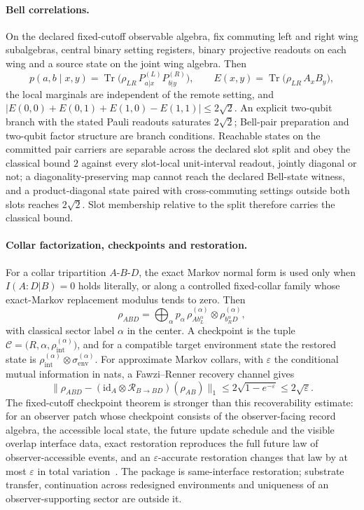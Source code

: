 \documentclass[11pt]{article}
\begin{document}
\paragraph{Bell correlations.}
On the declared fixed-cutoff observable algebra, fix commuting left and right
wing subalgebras, central binary setting registers, binary projective readouts
on each wing and a source state on the joint wing algebra. Then
\[
p(a,b\mid x,y)
=\operatorname{Tr}\!\bigl(\rho_{LR}\,P_{a|x}^{(L)}P_{b|y}^{(R)}\bigr),
\qquad
E(x,y)=\operatorname{Tr}\!\bigl(\rho_{LR}\,A_xB_y\bigr),
\]
the local marginals are independent of the remote setting, and
\(\bigl|E(0,0)+E(0,1)+E(1,0)-E(1,1)\bigr|\le 2\sqrt2\). An explicit two-qubit
branch with the stated Pauli readouts saturates \(2\sqrt2\); Bell-pair
preparation and two-qubit factor structure are branch conditions. Reachable
states on the committed pair carriers are separable across the declared slot
split and obey the classical bound \(2\) against every slot-local unit-interval
readout, jointly diagonal or not; a diagonality-preserving map cannot reach
the declared Bell-state witness, and a product-diagonal state paired with
cross-commuting settings outside both slots reaches \(2\sqrt2\). Slot
membership relative to the split therefore carries the classical bound.

\paragraph{Collar factorization, checkpoints and restoration.}
For a collar tripartition \(A\)-\(B\)-\(D\), the exact Markov normal form is
used only when \(I(A:D|B)=0\) holds literally, or along a controlled
fixed-collar family whose exact-Markov replacement modulus tends to zero. Then
\[
\rho_{ABD}
=\bigoplus_{\alpha} p_{\alpha}\,
\rho^{(\alpha)}_{A b_L^{\alpha}}
\otimes
\rho^{(\alpha)}_{b_R^{\alpha} D},
\]
with classical sector label \(\alpha\) in the center. A checkpoint is the tuple
\(\mathcal{C}=\bigl(R,\alpha,\rho_{\mathrm{int}}^{(\alpha)}\bigr)\), and for a
compatible target environment state the restored state is
\(\rho_{\mathrm{int}}^{(\alpha)}\otimes\sigma_{\mathrm{env}}^{(\alpha)}\). For
approximate Markov collars, with \(\varepsilon\) the conditional mutual
information in nats, a Fawzi--Renner recovery channel gives
\[
\bigl\|
\rho_{ABD}
-
(\mathrm{id}_A\otimes\mathcal{R}_{B\to BD})(\rho_{AB})
\bigr\|_1
\le
2\sqrt{1-e^{-\varepsilon}}
\le2\sqrt{\varepsilon}.
\]
The fixed-cutoff checkpoint theorem is stronger than this recoverability
estimate: for an observer patch whose checkpoint consists of the
observer-facing record algebra, the accessible local state, the future update
schedule and the visible overlap interface data, exact restoration reproduces
the full future law of observer-accessible events, and an
\(\varepsilon\)-accurate restoration changes that law by at most
\(\varepsilon\) in total variation~\cite{ophmicrophysics}. The package is
same-interface restoration; substrate transfer, continuation across redesigned
environments and uniqueness of an observer-supporting sector are outside it.
\end{document}
